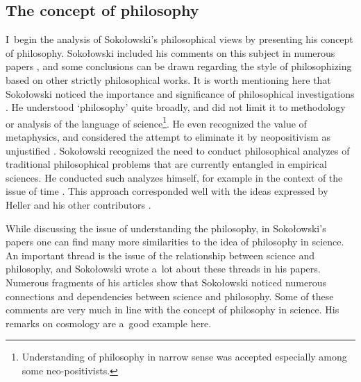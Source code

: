\documentclass[%
  manuscript=article,
  year=2024,
  volume=77,
  doi=00000.000,
]{zfn}
\begin{document}
\subsection{ The concept of philosophy}



I~begin the analysis of Sokołowski's philosophical views by presenting his concept of philosophy. Sokołowski included his comments on this subject in numerous papers 
\parencites[][]{Sokoowski1986Pluralizm}[][]{Sokoowski1989Gos}[][]{Sokoowski1990Nadwyzkowosc}[][]{Sokoowski2014Czy}[][]{Sokoowski2017Kopoty}, %
 and some conclusions can be drawn regarding the style of philosophizing based on other strictly philosophical works. It is worth mentioning here that Sokołowski noticed the importance and significance of philosophical investigations 
\parencite[][p.63]{Sokoowski1990Nadwyzkowosc}. %
 He understood ‘philosophy' quite broadly, and did not limit it to methodology or analysis of the language of science\footnote{Understanding of philosophy in narrow sense was accepted especially among some neo-positivists.}. He even recognized the value of metaphysics, and considered the attempt to eliminate it by neopositivism as unjustified 
\parencite[][p.198]{Sokoowski1986Pluralizm}. %
 Sokołowski recognized the need to conduct philosophical analyzes of traditional philosophical problems that are currently entangled in empirical sciences. He conducted such analyzes himself, for example in the context of the issue of time 
\parencite[][]{Sokoowski2000Czas}. %
 This approach corresponded well with the ideas expressed by Heller and his other contributors 
\parencites[][]{Heller1999Jak}[][]{Polak2019Philosophy}.%




While discussing the issue of understanding the philosophy, in Sokołowski's papers one can find many more similarities to the idea of philosophy in science. An important thread is the issue of the relationship between science and philosophy, and Sokołowski wrote a~lot about these threads in his papers. Numerous fragments of his articles show that Sokołowski noticed numerous connections and dependencies between science and philosophy. Some of these comments are very much in line with the concept of philosophy in science. His remarks on cosmology are a~good example here.
\end{document}
